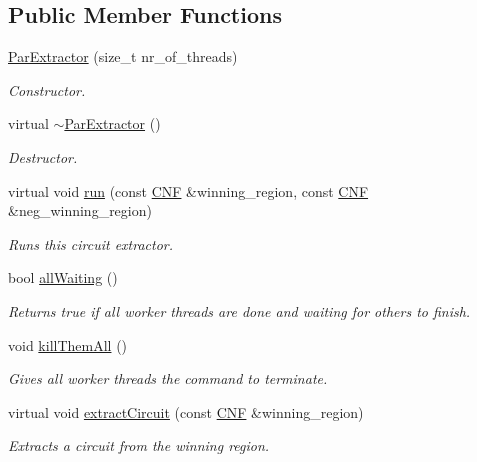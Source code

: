 \subsection*{Public Member Functions}
\begin{DoxyCompactItemize}
\item 
\hyperlink{classParExtractor_a5282e22c4a21a13ff869a9ddae497fbf}{Par\-Extractor} (size\-\_\-t nr\-\_\-of\-\_\-threads)
\begin{DoxyCompactList}\small\item\em Constructor. \end{DoxyCompactList}\item 
virtual \hyperlink{classParExtractor_abe14da2012110b7646c0770482f97371}{$\sim$\-Par\-Extractor} ()
\begin{DoxyCompactList}\small\item\em Destructor. \end{DoxyCompactList}\item 
virtual void \hyperlink{classParExtractor_a4fd5c02ddc2eb9d50ed6bb15656d1ee4}{run} (const \hyperlink{classCNF}{C\-N\-F} \&winning\-\_\-region, const \hyperlink{classCNF}{C\-N\-F} \&neg\-\_\-winning\-\_\-region)
\begin{DoxyCompactList}\small\item\em Runs this circuit extractor. \end{DoxyCompactList}\item 
bool \hyperlink{classParExtractor_a2732e5ec223519a6b6ebe4a2ff7a186f}{all\-Waiting} ()
\begin{DoxyCompactList}\small\item\em Returns true if all worker threads are done and waiting for others to finish. \end{DoxyCompactList}\item 
void \hyperlink{classParExtractor_af495000f06a4c909fc1219d8c530e22b}{kill\-Them\-All} ()
\begin{DoxyCompactList}\small\item\em Gives all worker threads the command to terminate. \end{DoxyCompactList}\item 
virtual void \hyperlink{classCNFImplExtractor_ad329eedd50e443f44edc99db8c2e2613}{extract\-Circuit} (const \hyperlink{classCNF}{C\-N\-F} \&winning\-\_\-region)
\begin{DoxyCompactList}\small\item\em Extracts a circuit from the winning region. \end{DoxyCompactList}\item 

\end{DoxyCompactItemize}
